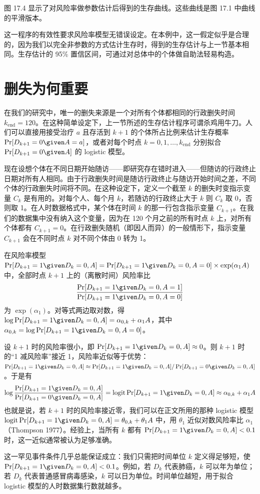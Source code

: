 图 17.4 显示了对风险率做参数估计后得到的生存曲线。这些曲线是图 17.1 中曲线的平滑版本。

这一程序的有效性要求风险率模型无错误设定。在本例中，这一假定似乎是合理的，因为我们以完全非参数的方式估计生存时，得到的生存估计与上一节基本相同。生存估计的 95\% 置信区间，可通过对总体中的个体做自助法轻易构造。

\section{删失为何重要}

在我们的研究中，唯一的删失来源是一个对所有个体都相同的行政删失时间 $k_{\text{end}}=120$。在这种简单设定下，上一节所述的生存估计程序可谓杀鸡用牛刀。人们可以直接用接受治疗 $a$ 且存活到 $k+1$ 的个体所占比例来估计生存概率 $\Pr[D_{k+1}=0\given A=a]$，或者对每个时点 $k=0,1,\dots,k_{\text{end}}$ 分别拟合 $\Pr[D_{k+1}=0\given A]$ 的 logistic 模型。

现在设想个体在不同日期开始随访——即研究存在错时进入——但随访的行政终止日期对所有人相同。由于行政删失时间是随访行政终止与随访开始时间之差，不同个体的行政删失时间将不同。在这种设定下，定义一个截至 $k$ 的删失时变指示变量 $C_k$ 是有用的。对每个人、每个月 $k$，若随访的行政终止大于 $k$ 则 $C_k$ 取 0，否则取 1。在人时数据格式中，某个体在时间 $k$ 的那一行包含指示变量 $C_{k+1}$。在我们的数据集中没有纳入这个变量，因为在 120 个月之前的所有时点 $k$ 上，对所有个体都有 $C_{k+1}=0$。在行政删失随机（即因人而异）的一般情形下，指示变量 $C_{k+1}$ 会在不同时点 $k$ 对不同个体由 0 转为 1。

\begin{techpoint}
在风险率模型 $\Pr[D_{k+1}=1\given D_k=0,A]=\Pr[D_{k+1}=1\given D_k=0,A=0]\times\exp(\alpha_1A)$ 中，全部时点 $k+1$ 上的（离散时间）风险率比
\[
\frac{\Pr[D_{k+1}=1\given D_k=0,A=1]}{\Pr[D_{k+1}=1\given D_k=0,A=0]}
\]
为 $\exp(\alpha_1)$。对等式两边取对数，得 $\log\Pr[D_{k+1}=1\given D_k=0,A]=\alpha_{0,k}+\alpha_1A$，其中 $\alpha_{0,k}=\log\Pr[D_{k+1}=1\given D_k=0,A=0]$。

设 $k+1$ 时的风险率很小，即 $\Pr[D_{k+1}=1\given D_k=0,A]\approx0$。则 $k+1$ 时的“1 减风险率”接近 1，风险率近似等于优势：$\Pr[D_{k+1}=1\given D_k=0,A]\approx\Pr[D_{k+1}=1\given D_k=0,A]/\Pr[D_{k+1}=0\given D_k=0,A]$。于是有
\[
\log\frac{\Pr[D_{k+1}=1\given D_k=0,A]}{\Pr[D_{k+1}=0\given D_k=0,A]}=\operatorname{logit}\Pr[D_{k+1}=1\given D_k=0,A]\approx\alpha_{0,k}+\alpha_1A
\]
也就是说，若 $k+1$ 时的风险率接近零，我们可以在正文所用的那种 logistic 模型 $\operatorname{logit}\Pr[D_{k+1}=1\given D_k=0,A]=\theta_{0,k}+\theta_1A$ 中，用 $\theta_1$ 近似对数风险率比 $\alpha_1$（Thompson 1977）。经验上，当所有 $k$ 都有 $\Pr[D_{k+1}=1\given D_k=0,A]<0.1$ 时，这一近似通常被认为足够准确。

这一罕见事件条件几乎总能保证成立：我们只需把时间单位 $k$ 定义得足够短，使 $\Pr[D_{k+1}=1\given D_k=0,A]<0.1$。例如，若 $D_k$ 代表肺癌，$k$ 可以年为单位；若 $D_k$ 代表普通感冒病毒感染，$k$ 可以日为单位。时间单位越短，用于拟合 logistic 模型的人时数据集行数就越多。
\end{techpoint}

